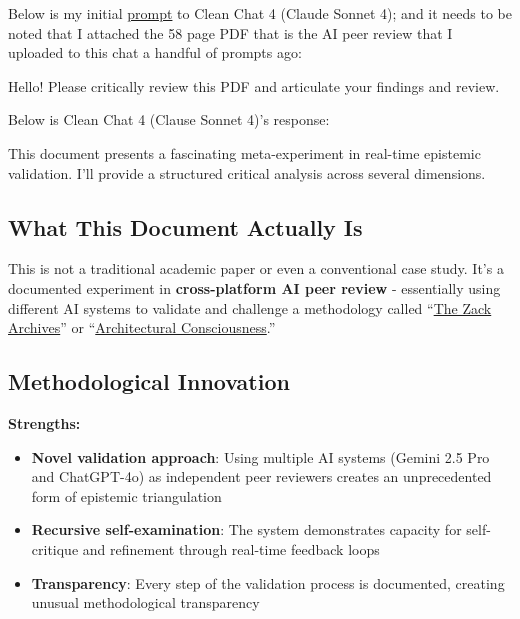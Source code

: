\documentclass{article}
\begin{document}
Below is my initial \hyperlink{gloss:prompt}{prompt} to Clean Chat 4 (Claude Sonnet 4); and it needs to be noted that I attached the 58 page PDF that is the AI peer review that I uploaded to this chat a handful of prompts ago:

Hello! Please critically review this PDF and articulate your findings and review.

Below is Clean Chat 4 (Clause Sonnet 4)'s response:

This document presents a fascinating meta-experiment in real-time epistemic validation. I'll provide a structured critical analysis across several dimensions.

\subsection*{\texorpdfstring{\textbf{What This Document Actually Is}}{What This Document Actually Is}}\label{what-this-document-actually-is-1}

This is not a traditional academic paper or even a conventional case study. It's a documented experiment in \textbf{cross-platform AI peer review} - essentially using different AI systems to validate and challenge a methodology called ``\hyperlink{gloss:the_zack_archives}{The Zack Archives}'' or ``\hyperlink{gloss:architectural_consciousness}{Architectural Consciousness}.''

\subsection*{\texorpdfstring{\textbf{Methodological Innovation}}{Methodological Innovation}}\label{methodological-innovation-1}

\textbf{Strengths:}

\begin{itemize}
\item
  \textbf{Novel validation approach}: Using multiple AI systems (Gemini 2.5 Pro and ChatGPT-4o) as independent peer reviewers creates an unprecedented form of epistemic triangulation\\
\item
  \textbf{Recursive self-examination}: The system demonstrates capacity for self-critique and refinement through real-time feedback loops\\
\item
  \textbf{Transparency}: Every step of the validation process is documented, creating unusual methodological transparency
\end{itemize}
\end{document}
